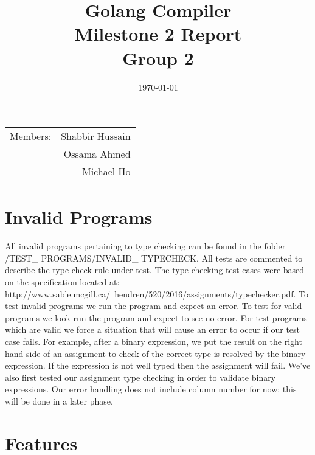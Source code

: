 \documentclass{article}
\title{Golang Compiler\\ Milestone 2 Report\\ Group 2} %
\date{\today} %
\begin{document}
\maketitle %

\begin{center}
\begin{tabular}{l r}
Members: & Shabbir Hussain \\ %
& Ossama Ahmed \\ %
& Michael Ho \\ \end{tabular}
\end{center}

\section{Invalid Programs}
All invalid programs pertaining to type checking can be found in the folder /TEST\_ PROGRAMS/INVALID\_ TYPECHECK. All tests are commented to describe the type check rule under test. The type checking test cases were based on the specification located at: http://www.sable.mcgill.ca/~hendren/520/2016/assignments/typechecker.pdf. To test invalid programs we run the program and expect an error. To test for valid programs we look run the program and expect to see no error. For test programs which are valid we force a situation that will cause an error to occur if our test case fails. For example, after a binary expression, we put the result on the right hand side of an assignment to check of the correct type is resolved by the binary expression. If the expression is not well typed then the assignment will fail. We've also first tested our assignment type checking in order to validate binary expressions. Our error handling does not include column number for now; this will be done in a later phase.



\section{Features}
\end{document}

